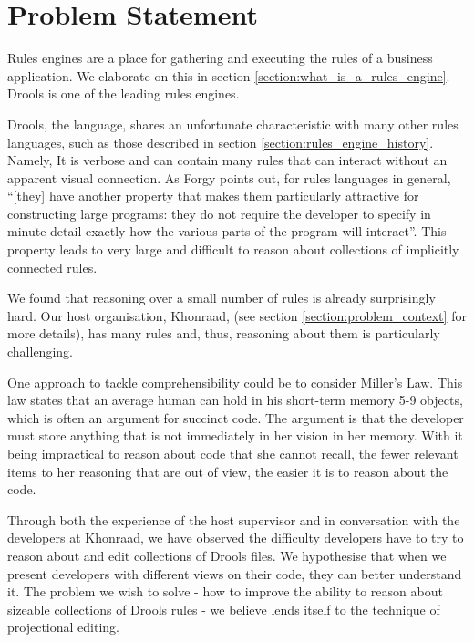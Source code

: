 \section{Problem Statement}
\label{section:problem_statement}

Rules engines are a place for gathering and executing the rules of a business application.
We elaborate on this in section \ref{section:what_is_a_rules_engine}.
Drools is one of the leading rules engines.

Drools, the language, shares an unfortunate characteristic with many other rules languages, such as those described in section \ref{section:rules_engine_history}.
Namely, It is verbose and can contain many rules that can interact without an apparent visual connection.
As Forgy\cite{forgy1989rete} points out, for rules languages in general, ``[they] have another property that makes them particularly attractive for constructing large programs: they do not require the developer to specify in minute detail exactly how the various parts of the program will interact''.
This property leads to very large and difficult to reason about collections of implicitly connected rules.

We found that reasoning over a small number of rules is already surprisingly hard.
Our host organisation, Khonraad, (see section \ref{section:problem_context} for more details), has many rules and, thus, reasoning about them is particularly challenging.

One approach to tackle comprehensibility could be to consider Miller's Law\cite{miller1956magical}.
This law states that an average human can hold in his short-term memory 5-9 objects, which is often an argument for succinct code.
The argument is that the developer must store anything that is not immediately in her vision in her memory.
With it being impractical to reason about code that she cannot recall, the fewer relevant items to her reasoning that are out of view, the easier it is to reason about the code.

Through both the experience of the host supervisor and in conversation with the developers at Khonraad, we have observed the difficulty developers have to try to reason about and edit collections of Drools files.
We hypothesise that when we present developers with different views on their code, they can better understand it.
The problem we wish to solve - how to improve the ability to reason about sizeable collections of Drools rules - we believe lends itself to the technique of projectional editing.

